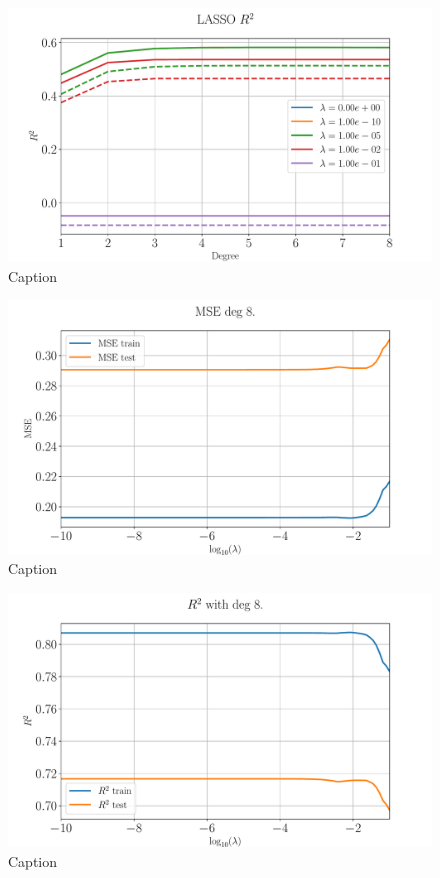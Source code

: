 \documentclass[%
reprint,
amsmath,amssymb,
aps,
pra,
]{revtex4-2}
\begin{document}
\begin{figure}[ht!]
\centering
\includegraphics[width=\linewidth]{Python/Figures/LASSO/LASSO_R2_no_scaling.pdf}
\caption{Caption}
\label{fig:lasso_r2_degree}
\end{figure}
\begin{figure}[ht!]
	\centering
	\includegraphics[width=\linewidth]{Python/Figures/LASSO/LASSO_logMSE_no_scaling.pdf}
	\caption{Caption}
	\label{fig:LASSO_logMSE_degree}
\end{figure}
\begin{figure}[ht!]
	\centering
	\includegraphics[width=\linewidth]{Python/Figures/LASSO/LASSO_logR2_no_scaling.pdf}
	\caption{Caption}
	\label{fig:LASSO_logR2_degree}
\end{figure}
\end{document}
